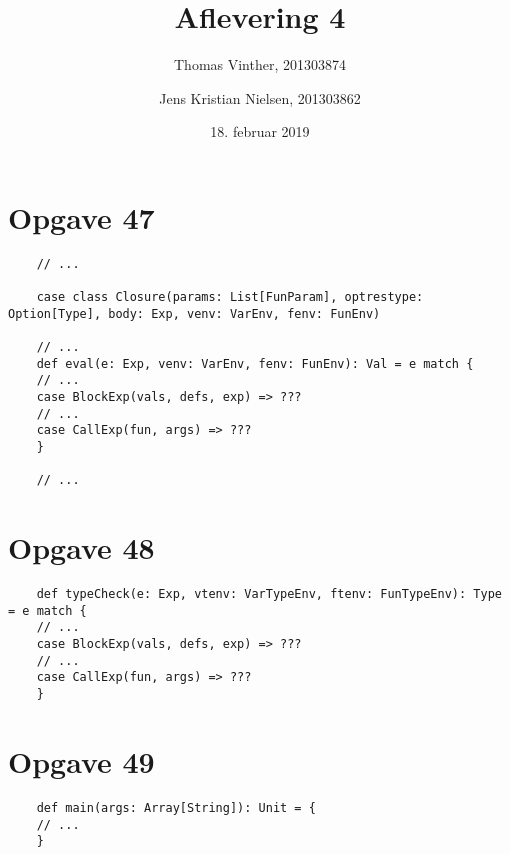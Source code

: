 \documentclass[a4paper, 10pt]{article}
\title{Aflevering 4}
\author{Thomas Vinther, 201303874 \and Jens Kristian Nielsen, 201303862}
\date{18. februar 2019}
\begin{document}
	\maketitle
	\section*{Opgave 47}
	\begin{lstlisting}
	// ...
	
	case class Closure(params: List[FunParam], optrestype: Option[Type], body: Exp, venv: VarEnv, fenv: FunEnv)
	
	// ...
	def eval(e: Exp, venv: VarEnv, fenv: FunEnv): Val = e match {
	// ...
	case BlockExp(vals, defs, exp) => ???
	// ...
	case CallExp(fun, args) => ???
	}
	
	// ...
	\end{lstlisting}
	
	\section*{Opgave 48}
	\begin{lstlisting}
	def typeCheck(e: Exp, vtenv: VarTypeEnv, ftenv: FunTypeEnv): Type = e match {
	// ...
	case BlockExp(vals, defs, exp) => ???
	// ...
	case CallExp(fun, args) => ???
	}
	\end{lstlisting}
	\section*{Opgave 49}
	\begin{lstlisting}
	def main(args: Array[String]): Unit = {
	// ...
	}
	\end{lstlisting}
\end{document}
